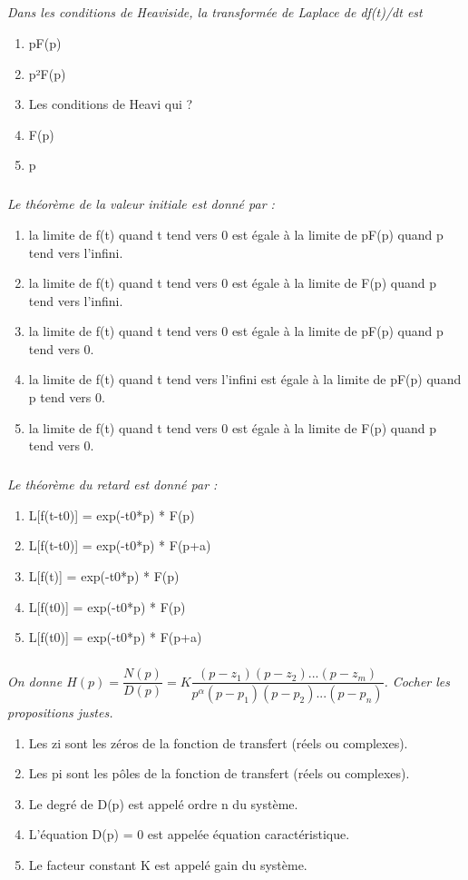 \documentclass[10pt,fleqn]{article} %
\begin{document}
\begin{multicols}{2}
\subparagraph{}\textit{Dans les conditions de Heaviside, la transformée de Laplace de df(t)/dt est}
\begin{enumerate}
\item pF(p)
\item p²F(p)
\item Les conditions de Heavi qui ?
\item F(p)
\item p
\end{enumerate}

\subparagraph{}\textit{Le théorème de la valeur initiale est donné par :}
\begin{enumerate}
\item la limite de f(t) quand t tend vers 0 est égale à la limite de pF(p) quand p tend vers l'infini.
\item la limite de f(t) quand t tend vers 0 est égale à la limite de F(p) quand p tend vers l'infini.
\item la limite de f(t) quand t tend vers 0 est égale à la limite de pF(p) quand p tend vers 0.
\item la limite de f(t) quand t tend vers l'infini est égale à la limite de pF(p) quand p tend vers 0.
\item la limite de f(t) quand t tend vers 0 est égale à la limite de F(p) quand p tend vers 0.
\end{enumerate}

\subparagraph{}\textit{Le théorème du retard est donné par :}
\begin{enumerate}
\item L[f(t-t0)] = exp(-t0*p) * F(p)
\item L[f(t-t0)] = exp(-t0*p) * F(p+a)
\item L[f(t)] = exp(-t0*p) * F(p)
\item L[f(t0)] = exp(-t0*p) * F(p)
\item L[f(t0)] = exp(-t0*p) * F(p+a)
\end{enumerate}

\subparagraph{}\textit{On donne 
$
H(p) = \dfrac{N(p)}{D(p)} =
K \dfrac{\left(p-z_1 \right)\left(p-z_2 \right)...\left(p-z_m \right)}{
p^{\alpha} \left(p-p_1 \right)\left(p-p_2 \right)...\left(p-p_n \right)}
$. 
Cocher les propositions justes.}
\begin{enumerate}
\item Les zi sont les zéros de la fonction de transfert (réels ou complexes).
\item Les pi sont les pôles de la fonction de transfert (réels ou complexes).
\item Le degré de D(p) est appelé ordre n du système.
\item L’équation D(p) = 0 est appelée équation caractéristique.
\item Le facteur constant K est appelé gain du système.
\end{enumerate}

\end{multicols}
\end{document}
